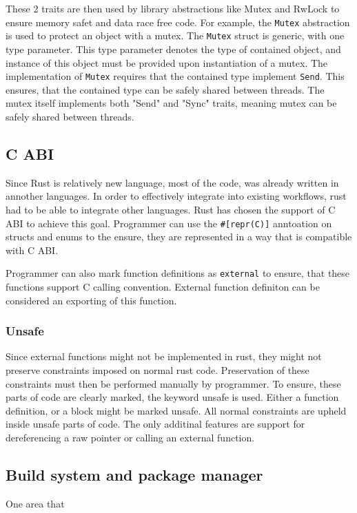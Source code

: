 These 2 traits are then used by library abstractions like Mutex and RwLock to ensure memory safet and data race free code.
For example, the \verb|Mutex| abstraction is used to protect an object with a mutex. The \verb|Mutex| struct is generic,
with one type parameter. This type parameter denotes the type of contained object, and instance of this object must be provided
upon instantiation of a mutex. The implementation of \verb|Mutex| requires that the contained type implement \verb|Send|.
This ensures, that the contained type can be safely shared between threads. The mutex itself implements both "Send" and "Sync" traits,
meaning mutex can be safely shared between threads.


\subsection{C ABI}
Since Rust is relatively new language, most of the code, was already written in annother languages. In order to
effectively integrate into existing workflows, rust had to be able to integrate other languages. Rust has chosen
the support of C ABI to achieve this goal. Programmer can use the \verb|#[repr(C)]| anntoation on structs and enums to
the ensure, they are represented in a way that is compatible with C ABI.

Programmer can also mark function definitions as \verb|external| to ensure, that these functions support C calling convention.
External function definiton can be considered an exporting of this function.

\subsubsection{Unsafe}
Since external functions might not be implemented in rust, they might not preserve constraints imposed on normal rust code.
Preservation of these constraints must then be performed manually by programmer. To ensure, these parts of code are clearly
marked, the keyword unsafe is used. Either a function definition, or a block might be marked unsafe. All normal constraints
are upheld inside unsafe parts of code. The only additinal features are support for dereferencing a raw pointer or calling
an external function.

\subsection{Build system and package manager}
One area that

